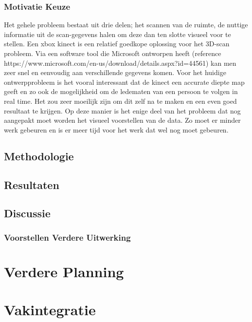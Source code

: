 \documentclass[a4paper,11pt]{article}
\begin{document}
	\subsubsection{Motivatie Keuze}
		Het gehele probleem bestaat uit drie delen; het scannen van de ruimte, de nuttige informatie uit de scan-gegevens halen om deze dan ten slotte visueel voor te stellen. Een xbox kinect is een relatief goedkope oplossing voor het 3D-scan probleem. Via een software tool die Microsoft ontworpen heeft (reference https://www.microsoft.com/en-us/download/details.aspx?id=44561) kan men zeer snel en eenvoudig aan verschillende gegevens komen. Voor het huidige ontwerpprobleem is het vooral interessant dat de kinect een accurate diepte map geeft en zo ook de mogelijkheid om de ledematen van een persoon te volgen in real time. Het zou zeer moeilijk zijn om dit zelf na te maken en een even goed resultaat te krijgen. Op deze manier is het enige deel van het probleem dat nog aangepakt moet worden het visueel voorstellen van de data. Zo moet er minder werk gebeuren en is er meer tijd voor het werk dat wel nog moet gebeuren.
	
	\subsection{Methodologie}
	\subsection{Resultaten}
	\subsection{Discussie}
	\subsubsection{Voorstellen Verdere Uitwerking}
	
	
	
	\section{Verdere Planning}
	
	
	
	\section{Vakintegratie}	%
	
\end{document}
